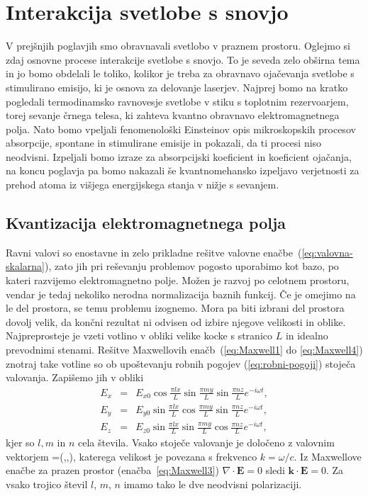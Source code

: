 \chapter{Interakcija svetlobe s snovjo}

V prejšnjih poglavjih smo obravnavali svetlobo v praznem prostoru. Oglejmo si
zdaj osnovne procese interakcije svetlobe s snovjo. To je seveda zelo
obširna tema in jo bomo obdelali le toliko, kolikor je treba za
obravnavo ojačevanja svetlobe s stimulirano emisijo, ki je osnova za
delovanje laserjev. Najprej bomo na kratko pogledali termodinamsko ravnovesje 
svetlobe v stiku s toplotnim rezervoarjem, torej sevanje črnega telesa, ki 
zahteva kvantno obravnavo elektromagnetnega polja. Nato bomo vpeljali fenomenološki
Einsteinov opis mikroskopskih procesov absorpcije, spontane in stimulirane
emisije in pokazali, da ti procesi niso neodvisni. Izpeljali bomo
izraze za absorpcijski koeficient in koeficient ojačanja, na koncu poglavja
pa bomo nakazali še kvantnomehansko izpeljavo verjetnosti za prehod
atoma iz višjega energijskega stanja v nižje s sevanjem.

\section{Kvantizacija elektromagnetnega polja}

Ravni valovi so enostavne in zelo prikladne rešitve valovne 
enačbe~(\ref{eq:valovna-skalarna}), zato jih pri reševanju problemov pogosto uporabimo kot 
bazo, po kateri razvijemo elektromagnetno polje. Možen je razvoj
po celotnem prostoru, vendar je tedaj nekoliko nerodna normalizacija baznih
funkcij. Če je omejimo na le del prostora, se temu problemu izognemo. Mora pa biti 
izbrani del prostora dovolj velik, da končni rezultat ni odvisen od izbire 
njegove velikosti in oblike.\\

\noindent
Najpreprosteje je vzeti votlino v obliki velike kocke s stranico
$L$ in idealno prevodnimi stenami. Rešitve Maxwellovih enačb~(\ref{eq:Maxwell1} do \ref{eq:Maxwell4}) 
znotraj take votline so ob upoštevanju robnih pogojev (\ref{eq:robni-pogoji}) 
stoječa valovanja. Zapišemo jih v obliki
\begin{eqnarray}
E_{x} & = & E_{x0}\cos\frac{\pi lx}{L}\sin\frac{\pi my}{L}\sin\frac{\pi nz}{L}e^{-i\omega t},\nonumber \\
E_{y} & = & E_{y0}\sin\frac{\pi lx}{L}\cos\frac{\pi my}{L}\sin\frac{\pi nz}{L}e^{-i\omega t},\nonumber \\
E_{z} & = & E_{z0}\sin\frac{\pi lx}{L}\sin\frac{\pi my}{L}\cos\frac{\pi nz}{L}e^{-i\omega t},
\label{eq:stojece_votlina}
\end{eqnarray}
kjer so $l,m$ in $n$ cela števila. Vsako stoječe valovanje je določeno z valovnim 
vektorjem 
\beq
{}=\left(,,\right),
\eeq 
katerega velikost je povezana s frekvenco $k = \omega/c$.
Iz Maxwellove enačbe za prazen prostor (enačba~\ref{eq:Maxwell3}) 
$\nabla\cdot\mathbf{E}=0$ sledi $\mathbf{k}\cdot\mathbf{E}=0$. 
Za vsako trojico števil $l$, $m$, $n$ imamo tako le dve
neodvisni polarizaciji.

